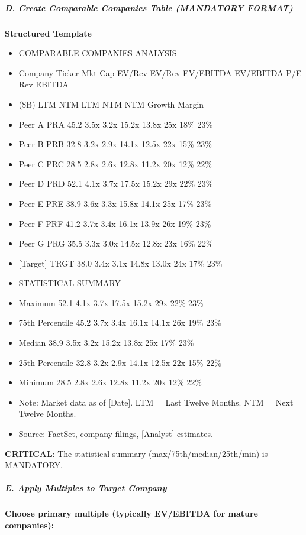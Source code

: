 \documentclass[11pt]{article}
\begin{document}
\subparagraph{D. Create Comparable Companies Table (MANDATORY FORMAT)}\mbox{}\par

\textbf{Structured Template}
\begin{itemize}[leftmargin=*,itemsep=2pt,topsep=2pt]
\item {} COMPARABLE COMPANIES ANALYSIS
\item {} Company Ticker Mkt Cap EV/Rev EV/Rev EV/EBITDA EV/EBITDA P/E Rev EBITDA
\item {} (\$B) LTM NTM LTM NTM NTM Growth Margin
\item {} Peer A PRA 45.2 3.5x 3.2x 15.2x 13.8x 25x 18\% 23\%
\item {} Peer B PRB 32.8 3.2x 2.9x 14.1x 12.5x 22x 15\% 23\%
\item {} Peer C PRC 28.5 2.8x 2.6x 12.8x 11.2x 20x 12\% 22\%
\item {} Peer D PRD 52.1 4.1x 3.7x 17.5x 15.2x 29x 22\% 23\%
\item {} Peer E PRE 38.9 3.6x 3.3x 15.8x 14.1x 25x 17\% 23\%
\item {} Peer F PRF 41.2 3.7x 3.4x 16.1x 13.9x 26x 19\% 23\%
\item {} Peer G PRG 35.5 3.3x 3.0x 14.5x 12.8x 23x 16\% 22\%
\item {} [Target] TRGT 38.0 3.4x 3.1x 14.8x 13.0x 24x 17\% 23\%
\item {} STATISTICAL SUMMARY
\item {} Maximum 52.1 4.1x 3.7x 17.5x 15.2x 29x 22\% 23\%
\item {} 75th Percentile 45.2 3.7x 3.4x 16.1x 14.1x 26x 19\% 23\%
\item {} Median 38.9 3.5x 3.2x 15.2x 13.8x 25x 17\% 23\%
\item {} 25th Percentile 32.8 3.2x 2.9x 14.1x 12.5x 22x 15\% 22\%
\item {} Minimum 28.5 2.8x 2.6x 12.8x 11.2x 20x 12\% 22\%
\item {} Note: Market data as of [Date]. LTM = Last Twelve Months. NTM = Next Twelve Months.
\item {} Source: FactSet, company filings, [Analyst] estimates.
\end{itemize}

\textbf{CRITICAL}: The statistical summary (max/75th/median/25th/min) is MANDATORY.


\subparagraph{E. Apply Multiples to Target Company}\mbox{}\par

\textbf{Choose primary multiple (typically EV/EBITDA for mature companies):}
\end{document}
